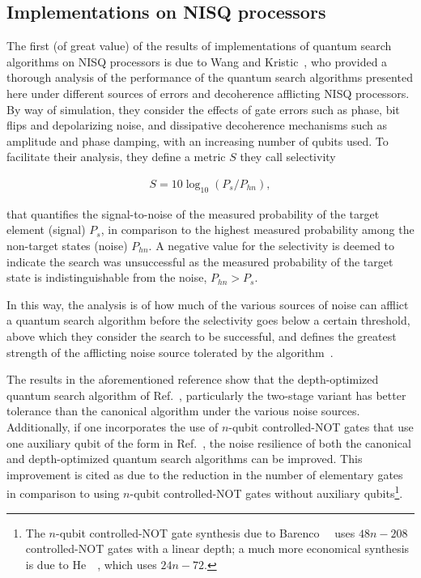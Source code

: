\bigskip
\subsection{Implementations on NISQ processors}%
The first (of great value) of the results of implementations of quantum search algorithms on \acs{NISQ} processors is due to Wang and Kristic~\cite{Wang_2020}, who provided a thorough analysis of the performance of the quantum search algorithms presented here under different sources of errors and decoherence afflicting \acs{NISQ} processors. By way of simulation, they consider the effects of gate errors such as phase, bit flips and depolarizing noise, and dissipative decoherence mechanisms such as amplitude and phase damping, with an increasing number of qubits used. To facilitate their analysis, they define a metric $S$ they call selectivity 

\begin{align}
	S = 10 \log_{10}{(P_{s} / P_{hn})},
\end{align}

\noindent
that quantifies the signal-to-noise of the measured probability of the target element (signal) $P_{s}$, in comparison to the highest measured probability among the non-target states (noise) $P_{hn}$. A negative value for the selectivity is deemed to indicate the search was unsuccessful as the measured probability of the target state is indistinguishable from the noise, \ie $P_{hn} > P_{s}$. 

\clearpage
\noindent
In this way, the analysis is of how much of the various sources of noise can afflict a quantum search algorithm before the selectivity goes below a certain threshold, above which they consider the search to be successful, and defines the greatest strength of the afflicting noise source tolerated by the algorithm~\cite{Wang_2020}.

\bigskip
\noindent
The results in the aforementioned reference show that the depth-optimized quantum search algorithm of Ref.~\cite{Zhang_2020}, particularly the two-stage variant has better tolerance than the canonical algorithm under the various noise sources. Additionally, if one incorporates the use of $n$-qubit controlled-NOT gates that use one auxiliary qubit of the form in Ref.~\cite{Barenco_1995}, the noise resilience of both the canonical and depth-optimized quantum search algorithms can be improved. This improvement is cited as due to the reduction in the number of elementary gates in comparison to using $n$-qubit controlled-NOT gates without auxiliary qubits\footnote{The $n$-qubit controlled-NOT gate synthesis due to Barenco~\etal~\cite{Barenco_1995} uses $48n-208$ controlled-NOT gates with a linear depth; a much more economical synthesis is due to He~\etal~\cite{He_2017}, which uses $24n - 72$.}.


